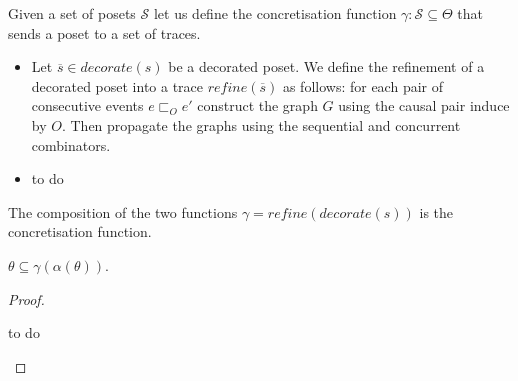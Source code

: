 \begin{definition}
  Given a set of posets $\mathcal{S}$ let us define the concretisation function $\gamma:\mathcal{S}\subseteq\Theta$ that sends a poset to a set of traces.
  \begin{itemize}
  \item Let $\overline{s}\in\mathit{decorate}(s)$ be a decorated poset. We define the refinement of a decorated poset into a trace $\mathit{refine}(\overline{s})$ as follows: for each pair of consecutive events $e \sqsubset_O e'$ construct the graph $G$ using the causal pair induce by $O$. Then propagate the graphs using the sequential and concurrent combinators.
  \item
    \begin{mdframed}[backgroundcolor=blue!20]
      to do
    \end{mdframed}
  \end{itemize}
  The composition of the two functions $\gamma = \mathit{refine}(\mathit{decorate}(s))$ is the concretisation function.
\end{definition}

\begin{lemma}
  $\theta\subseteq \gamma(\alpha(\theta))$.
\end{lemma}
\begin{proof}
    \begin{mdframed}[backgroundcolor=blue!20]
    to do
  \end{mdframed}

\end{proof}
